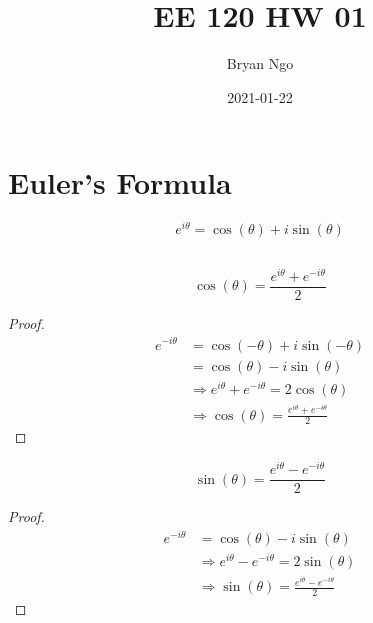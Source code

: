 \documentclass{article}
\title{EE 120 HW 01}
\author{Bryan Ngo}
\date{2021-01-22}
\begin{document}
\maketitle

\section{Euler's Formula}

\begin{equation}
    e^{i \theta} = \cos(\theta) + i \sin(\theta)
\end{equation}

\subsection{}

\begin{theorem}
    \begin{equation}
        \cos(\theta) = \frac{e^{i \theta} + e^{-i \theta}}{2}
    \end{equation}
\end{theorem}
\begin{proof}
    \begin{align}
        e^{-i \theta} &= \cos(-\theta) + i \sin(-\theta) \\
        &= \cos(\theta) - i \sin(\theta) \\
        &\Rightarrow e^{i \theta} + e^{-i \theta} = 2 \cos(\theta) \\
        &\Rightarrow \cos(\theta) = \frac{e^{i \theta} + e^{-i \theta}}{2}
    \end{align}
\end{proof}
\begin{theorem}
    \begin{equation}
        \sin(\theta) = \frac{e^{i \theta} - e^{-i \theta}}{2}
    \end{equation}
\end{theorem}
\begin{proof}
    \begin{align}
        e^{-i \theta} &= \cos(\theta) - i \sin(\theta) \\
        &\Rightarrow e^{i \theta} - e^{-i \theta} = 2 \sin(\theta) \\
        &\Rightarrow \sin(\theta) = \frac{e^{i \theta} - e^{-i \theta}}{2}
    \end{align}
\end{proof}

\subsection{}
\end{document}
